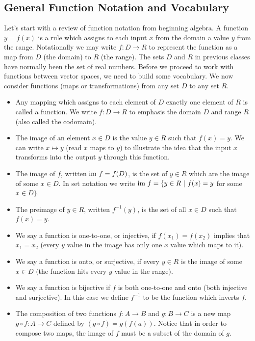 \subsection{General Function Notation and Vocabulary}
Let's start with a review of function notation from beginning algebra. 
A function $y=f(x)$ is a rule which assigns to each input $x$ from the domain a value $y$ from the range. 
Notationally we may write $f:D\to R$ to represent the function as a map from $D$ (the domain) to $R$ (the range).  
The sets $D$ and $R$ in previous classes have normally been the set of real numbers. 
Before we proceed to work with functions between vector spaces, we need to build some vocabulary. 
We now consider functions (maps or transformations) from any set $D$ to any set $R$.
\begin{definition}
\begin{itemize}
	\item Any mapping which assigns to each element of $D$ exactly one element of $R$ is called a function. We write $f:D\to R$ to emphasis the domain $D$ and range $R$ (also called the codomain). 

	\item The image of an element $x\in D$ is the value $y\in R$ such that $f(x)=y$. We can write $x\mapsto y$ (read $x$ maps to $y$) to illustrate the idea that the input $x$ transforms into the output $y$ through this function. 

	\item The image of $f$, written $\text{im } f=f(D)$, is the set of $y\in R$ which are the image of some $x\in D$. In set notation we write $\im f = \{y\in R\ |\ f(x)=y$ for some $x\in D\}$.

	\item The preimage of $y\in R$, written $f^{-1}(y)$, is the set of all $x\in D$ such that $f(x)=y$. 
	
	\item We say a function is one-to-one, or injective, if $f(x_1)=f(x_2)$ implies that $x_1=x_2$ (every $y$ value in the image has only one $x$ value which maps to it).  
	\item We say a function is onto, or surjective, if every $y\in R$ is the image of some $x\in D$ (the function hits every $y$ value in the range).  
	\item We say a function is bijective if $f$ is both one-to-one and onto (both injective and surjective). In this case we define $f^{-1}$ to be the function which inverts $f$. 
	\item The composition of two functions $f:A\to B$ and $g:B\to C$ is a new map $g\circ f:A\to C$ defined by $(g\circ f)=g(f(a))$. Notice that in order to compose two maps, the image of $f$ must be a subset of the domain of $g$.  

\end{itemize}
\end{definition}


